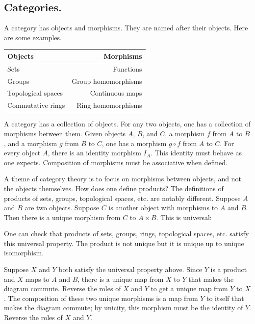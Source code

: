 \documentclass [11 pt, oneside] {article}
\begin{document}
\subsection{Categories.}
A category has objects and morphisms. They are named after their objects. Here are some examples.
\begin{center}
\begin{tabular}{lr}
    Objects & Morphisms\\
    \midrule
    Sets & Functions\\
    Groups & Group homomorphisms\\
    Topological spaces & Continuous maps\\
    Commutative rings & Ring homomorphisms
\end{tabular}
\end{center}
A category has a collection of objects. For any two objects, one has a collection of morphisms between them. Given objects $A$, $B$, and $C$, a morphism $f$ from $A$ to $B$, and a morphism $g$ from $B$ to $C$, one has a morphism $g\circ f$ from $A$ to $C$. For every object $A$, there is an identity morphism $I_A$. This identity must behave as one expects. Composition of morphisms must be associative when defined.

A theme of category theory is to focus on morphisms between objects, and not the objects themselves. How does one define products? The definitions of products of sets, groups, topological spaces, etc. are notably different. Suppose $A$ and $B$ are two objects. Suppose $C$ is another object with morphisms to $A$ and $B$. Then there is a unique morphism from $C$ to $A\times B$. This is universal:
\begin{center}
\end{center}
One can check that products of sets, groups, rings, topological spaces, etc. satisfy this universal property. The product is not unique but it is unique up to unique isomorphism.

Suppose $X$ and $Y$ both satisfy the universal property above. Since $Y$ is a product and $X$ maps to $A$ and $B$, there is a unique map from $X$ to $Y$ that makes the diagram commute. Reverse the roles of $X$ and $Y$ to get a unique map from $Y$ to $X$. The composition of these two unique morphisms is a map from $Y$ to itself that makes the diagram commute; by unicity, this morphism must be the identity of $Y$. Reverse the roles of $X$ and $Y$.
\end{document}
